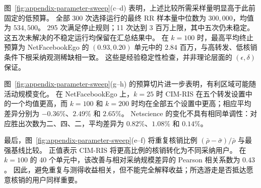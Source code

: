 \documentclass[sigconf,balance=false]{acmart}
\newcommand{\CIMRIS}{\textsc{CIM-RIS}}
\begin{document}
图~\ref{fig:appendix-parameter-sweep}(c--d) 表明，上述比较所需采样量明显高于此前固定的低预算。
全部 300 次选择运行的最终 RR 样本量中位数为 $300{,}000$，均值为 $534{,}500$。
295 次满足停止规则；11 次达到 $3$ 百万上限，其中五次仍未稳定。
这五次未解决的不稳定运行均保留在汇总结果中。
在 $k=100$ 时，最高平均终止预算为 NetFacebookEgo 的 $(0.93,0.20)$ 单元中的 $2.84$ 百万，与高转发、低核销条件下根采纳观测稀缺相一致。
这些是经验稳定性检查，并非理论层面的 $(\epsilon,\delta)$ 保证。

图~\ref{fig:appendix-parameter-sweep}(g--h) 的预算切片进一步表明，有利区域可能随活动规模变化。
在 NetFacebookEgo 上，$k=25$ 时 \CIMRIS{} 在五个转发设置中的一个均值更高，而 $k=100$ 和 $k=200$ 时均在全部五个设置中更高；相应平均差异分别为 $-0.36\%$、$2.49\%$ 和 $2.65\%$。
Netscience 的变化不具有相同单调性：对应胜出次数为二、四、二，平均差异为 $0.82\%$、$1.08\%$ 和 $0.14\%$。

最后，图~\ref{fig:appendix-parameter-sweep}(e--f) 将重复核销比例 $(\bar\rho-\bar\sigma)/\bar\rho$ 与最强基线比较。
正值表示 \CIMRIS{} 将更高比例的核销转化为不同采纳用户。
在 $k=100$ 的 40 个单元中，该改善与相对采纳规模差异的 Pearson 相关系数为 $0.43$。
因此，避免重复与测得收益相关，但不能完全解释收益；所选游走是否抵达愿意核销的用户同样重要。
\FloatBarrier
\balance



\end{document}

